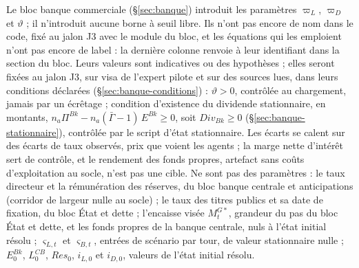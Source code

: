 \documentclass[11pt,a4paper]{article}
\begin{document}
\begin{proposee}
Le bloc banque commerciale (\S\ref{sec:banque}) introduit les paramètres $\varpi_L$, $\varpi_D$ et $\vartheta$ ; il n'introduit aucune borne à seuil libre. Ils n'ont pas encore de nom dans le code, fixé au jalon J3 avec le module du bloc, et les équations qui les emploient n'ont pas encore de label : la dernière colonne renvoie à leur identifiant dans la section du bloc. Leurs valeurs sont indicatives ou des hypothèses ; elles seront fixées au jalon J3, sur visa de l'expert pilote et sur des sources lues, dans leurs conditions déclarées (\S\ref{sec:banque-conditions}) : $\vartheta > 0$, contrôlée au chargement, jamais par un écrêtage ; condition d'existence du dividende stationnaire, en montants, $n_a\Pi^{\mathit{Bk}} - n_a(\bar\Gamma - 1)\,E^{\mathit{Bk}} \ge 0$, soit $\mathit{Div}_{\mathit{Bk}} \ge 0$ (\S\ref{sec:banque-stationnaire}), contrôlée par le script d'état stationnaire. Les écarts se calent sur des écarts de taux observés, prix que voient les agents ; la marge nette d'intérêt sert de contrôle, et le rendement des fonds propres, artefact sans coûts d'exploitation au socle, n'est pas une cible. Ne sont pas des paramètres : le taux directeur et la rémunération des réserves, du bloc banque centrale et anticipations (corridor de largeur nulle au socle) ; le taux des titres publics et sa date de fixation, du bloc État et dette ; l'encaisse visée $M^{G*}_t$, grandeur du pas du bloc État et dette, et les fonds propres de la banque centrale, nuls à l'état initial résolu ; $\varsigma_{L,t}$ et $\varsigma_{B,t}$, entrées de scénario par tour, de valeur stationnaire nulle ; $E^{\mathit{Bk}}_0$, $L^{\mathit{CB}}_0$, $\mathit{Res}_0$, $i_{L,0}$ et $i_{D,0}$, valeurs de l'état initial résolu.
\end{proposee}
\end{document}
